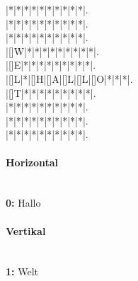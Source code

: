 \begin{Puzzle}{10}{10}%
|*|*|*|*|*|*|*|*|*|*|.\\
|*|*|*|*|*|*|*|*|*|*|.\\
|*|*|*|*|*|*|*|*|*|*|.\\
|[]W|*|*|*|*|*|*|*|*|*|.\\
|[]E|*|*|*|*|*|*|*|*|*|.\\
|[]L|*|[]H|[]A|[]L|[]L|[]O|*|*|*|.\\
|[]T|*|*|*|*|*|*|*|*|*|.\\
|*|*|*|*|*|*|*|*|*|*|.\\
|*|*|*|*|*|*|*|*|*|*|.\\
|*|*|*|*|*|*|*|*|*|*|.\\
\end{Puzzle}

\paragraph*{Horizontal}~\\
{\bfseries 0: }Hallo\\
\paragraph*{Vertikal}~\\
{\bfseries 1: }Welt\\
